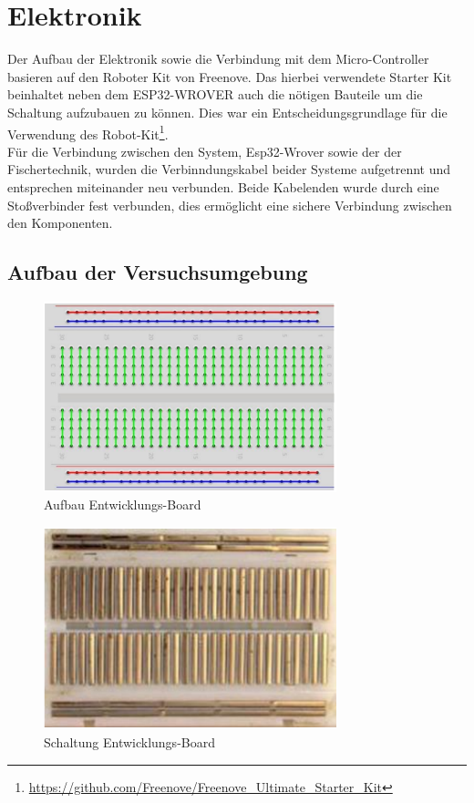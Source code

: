 \documentclass[conference,compsoc,final,a4paper]{IEEEtran}
\begin{document}
\section{Elektronik}
Der Aufbau der Elektronik sowie die Verbindung mit dem Micro-Controller basieren auf den Roboter Kit von Freenove. 
Das hierbei verwendete Starter Kit beinhaltet neben dem ESP32-WROVER auch die nötigen Bauteile um die Schaltung aufzubauen zu können. 
Dies war ein Entscheidungsgrundlage für die Verwendung des Robot-Kit\footnote{\url{https://github.com/Freenove/Freenove\_Ultimate\_Starter\_Kit}}.
\\

Für die Verbindung zwischen den System, Esp32-Wrover sowie der der Fischertechnik, wurden die Verbinndungskabel beider Systeme aufgetrennt und entsprechen miteinander neu verbunden.
Beide Kabelenden wurde durch eine Stoßverbinder fest verbunden, dies ermöglicht eine sichere Verbindung zwischen den Komponenten.

\subsection{Aufbau der Versuchsumgebung}
\begin{figure}[h]
\centering
\includegraphics[width=8.5cm]{../images/board.png}
\caption{Aufbau Entwicklungs-Board \autocite{freenoveTutorial}}\label{Elektrik:DevBoard}
\end{figure}

\begin{figure}[h]
\centering
\includegraphics[width=8.5cm]{../images/board2.png}
\caption{Schaltung Entwicklungs-Board \autocite{freenoveTutorial}}\label{Elektrik:DevBoardInternal}
\end{figure}
\end{document}
